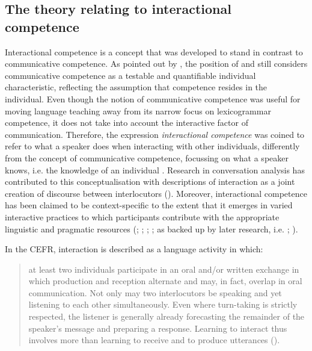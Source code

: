 \subsection{The theory relating to interactional competence}
\label{sec:1.1.2}

Interactional competence is a concept that was developed to stand in contrast to communicative competence. As pointed out by \citet{Young2014}, the position of \citet{Hymes1972} and \citet{CanaleSwain1980} still considers communicative competence as a testable and quantifiable individual characteristic, reflecting the assumption that competence resides in the individual. Even though the notion of communicative competence was useful for moving language teaching away from its narrow focus on lexicogrammar competence, it does not take into account the interactive factor of communication. Therefore, the expression \textit{interactional competence} was coined to refer to what a speaker does when interacting with other individuals, differently from the concept of communicative competence, focussing on what a speaker knows, i.e. the knowledge of an individual \citep{Young2011}. Research in conversation analysis has contributed to this conceptualisation with descriptions of interaction as a joint creation of discourse between interlocutors (\citealt{JacobyOchs1995}). Moreover, interactional competence has been claimed to be context-specific to the extent that it emerges in varied interactive practices to which participants contribute with the appropriate linguistic and pragmatic resources (\citealt{Hall1993}; \citealt{HeYoung1998}; \citealt{Hall1995}; \citealt{Young2011}; as backed up by later research, i.e. \citealt{Tavakoli2016}; \citealt{Witton-Davies2014}).

In the CEFR, interaction is described as a language activity in which: 

\begin{quote}
at least two individuals participate in an oral and/or written exchange in which production and reception alternate and may, in fact, overlap in oral communication. Not only may two interlocutors be speaking and yet listening to each other simultaneously. Even where turn-taking is strictly respected, the listener is generally already forecasting the remainder of the speaker’s message and preparing a response. Learning to interact thus involves more than learning to receive and to produce utterances (\citealt[14]{CouncilOfEurope2001}).
\end{quote}

